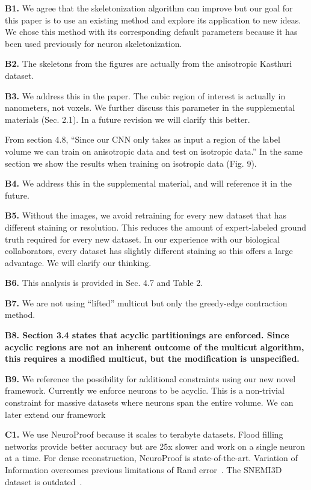 \documentclass[10pt,twocolumn,letterpaper]{article}
\begin{document}
\textbf{B1.} 
We agree that the skeletonization algorithm can improve but our goal for this paper is to use an existing method and explore its application to new ideas.
We chose this method with its corresponding default parameters because it has been used previously for neuron skeletonization.

\textbf{B2.} 
The skeletons from the figures are actually from the anisotropic Kasthuri dataset.

\textbf{B3.} 
We address this in the paper.
The cubic region of interest is actually in nanometers, not voxels.
We further discuss this parameter in the supplemental materials (Sec. 2.1). 
In a future revision we will clarify this better.

From section 4.8, ``Since our CNN only takes as input a region of the label volume we can train on anisotropic data and test on isotropic data.'' 
In the same section we show the results when training on isotropic data (Fig. 9). 

\textbf{B4.} 
We address this in the supplemental material, and will reference it in the future.

\textbf{B5.} 
Without the images, we avoid retraining for every new dataset that has different staining or resolution.
This reduces the amount of expert-labeled ground truth required for every new dataset.
In our experience with our biological collaborators, every dataset has slightly different staining so this offers a large advantage.
We will clarify our thinking.

\textbf{B6.} 
This analysis is provided in Sec. 4.7 and Table 2.

\textbf{B7.} 
We are not using ``lifted'' multicut but only the greedy-edge contraction method.

\textbf{B8. Section 3.4 states that acyclic partitionings are enforced. Since acyclic regions are not an inherent outcome of the multicut algorithm, this requires a modified multicut, but the modification is unspecified.}

\textbf{B9.} 
We reference the possibility for additional constraints using our new novel framework. 
Currently we enforce neurons to be acyclic.
This is a non-trivial constraint for massive datasets where neurons span the entire volume. 
We can later extend our framework 

\textbf{C1.} We use NeuroProof because it scales to terabyte datasets. 
Flood filling networks provide better accuracy but are 25x slower and work on a single neuron at a time. 
For dense reconstruction, NeuroProof is state-of-the-art. 
Variation of Information overcomes previous limitations of Rand error~\cite{lee2017superhuman,nunez2013machine}. 
The SNEMI3D dataset is outdated~\cite{lee2017superhuman}. 
\end{document}
